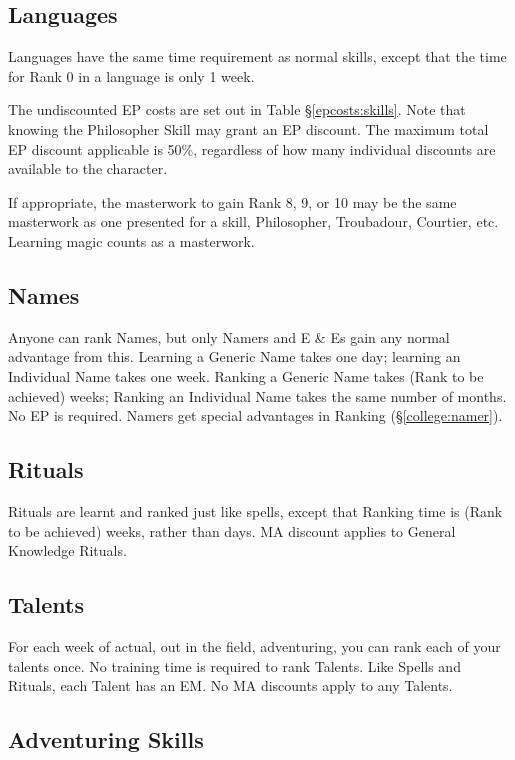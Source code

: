\begin{multicols}{3}
\subsection{Languages}

Languages have the same time requirement as normal skills, except that
the time for Rank 0 in a language is only 1 week.

The undiscounted EP costs are set out in Table \S\ref{epcosts:skills}.
Note that knowing the Philosopher Skill may grant an EP discount. The
maximum total EP discount applicable is 50\%, regardless of how many
individual discounts are available to the character.

If appropriate, the masterwork to gain Rank 8, 9, or 10 may be the
same masterwork as one presented for a skill, \eg Philosopher,
Troubadour, Courtier, etc.  Learning magic counts as a masterwork.

\subsection{Names}

Anyone can rank Names, but only Namers and E \& Es gain any normal
advantage from this.  Learning a Generic Name takes one day; learning
an Individual Name takes one week. Ranking a Generic Name takes (Rank
to be achieved) weeks; Ranking an Individual Name takes the same
number of months. No EP is required. Namers get special advantages in
Ranking (\S\ref{college:namer}).

\subsection{Rituals}

Rituals are learnt and ranked just like spells, except that Ranking
time is (Rank to be achieved) weeks, rather than days.  MA discount
applies to General Knowledge Rituals.

\subsection{Talents}

For each week of actual, out in the field, adventuring, you can rank
each of your talents once.  No training time is required to rank
Talents. Like Spells and Rituals, each Talent has an EM. No MA
discounts apply to any Talents.

\subsection{Adventuring Skills}


\end{multicols}
